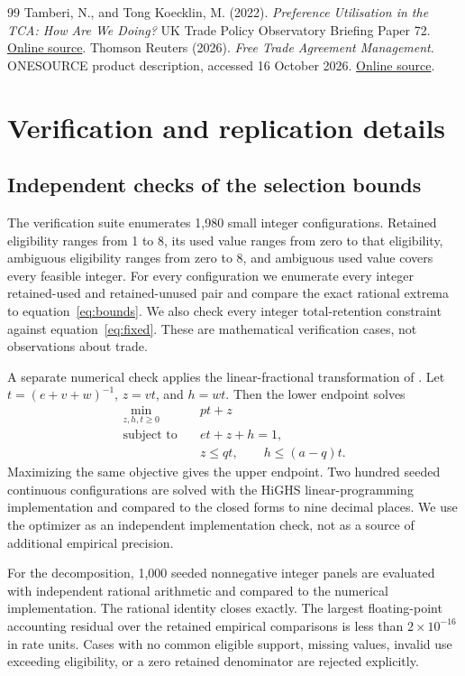 \documentclass[11pt,a4paper]{article}
\begin{document}
\begin{thebibliography}{99}
 Tamberi, N., and Tong Koecklin, M. (2022). \emph{Preference Utilisation in the TCA: How Are We Doing?} UK Trade Policy Observatory Briefing Paper 72. \href{https://blogs.sussex.ac.uk/uktpo/files/2022/12/BP-72-v2.pdf}{Online source}.
 Thomson Reuters (2026). \emph{Free Trade Agreement Management}. ONESOURCE product description, accessed 16 October 2026. \href{https://africa.thomsonreuters.com/en/products-services/global-trade-management/free-trade-agreement.html}{Online source}.
\end{thebibliography}

\appendix
\section{Verification and replication details}
\subsection{Independent checks of the selection bounds}
The verification suite enumerates 1,980 small integer configurations. Retained eligibility ranges from 1 to 8, its used value ranges from zero to that eligibility, ambiguous eligibility ranges from zero to 8, and ambiguous used value covers every feasible integer. For every configuration we enumerate every integer retained-used and retained-unused pair and compare the exact rational extrema to equation~\eqref{eq:bounds}. We also check every integer total-retention constraint against equation~\eqref{eq:fixed}. These are mathematical verification cases, not observations about trade.

A separate numerical check applies the linear-fractional transformation of \citet{charnes1962}. Let $t=(e+v+w)^{-1}$, $z=vt$, and $h=wt$. Then the lower endpoint solves
\begin{align}
 \min_{z,h,t\geq0}\quad &pt+z\\
 \text{subject to}\quad &et+z+h=1,\\
 &z\leq qt,\qquad h\leq(a-q)t.
\end{align}
Maximizing the same objective gives the upper endpoint. Two hundred seeded continuous configurations are solved with the HiGHS linear-programming implementation and compared to the closed forms to nine decimal places. We use the optimizer as an independent implementation check, not as a source of additional empirical precision.

For the decomposition, 1,000 seeded nonnegative integer panels are evaluated with independent rational arithmetic and compared to the numerical implementation. The rational identity closes exactly. The largest floating-point accounting residual over the retained empirical comparisons is less than $2\times10^{-16}$ in rate units. Cases with no common eligible support, missing values, invalid use exceeding eligibility, or a zero retained denominator are rejected explicitly.
\end{document}
